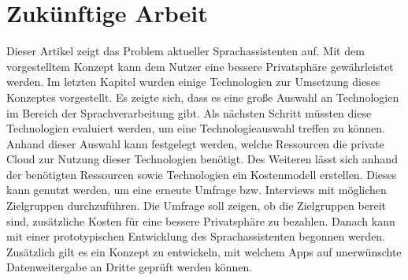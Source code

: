 \section{Zukünftige Arbeit}
Dieser Artikel zeigt das Problem aktueller Sprachassistenten auf. Mit dem vorgestelltem Konzept kann dem Nutzer eine bessere Privatsphäre gewährleistet werden. Im letzten Kapitel wurden einige Technologien zur Umsetzung dieses Konzeptes vorgestellt. Es zeigte sich, dass es eine große Auswahl an Technologien im Bereich der Sprachverarbeitung gibt. Als nächsten Schritt müssten diese Technologien evaluiert werden, um eine Technologieauswahl treffen zu können. Anhand dieser Auswahl kann festgelegt werden, welche Ressourcen die private Cloud zur Nutzung dieser Technologien benötigt. Des Weiteren lässt sich anhand der benötigten Ressourcen sowie Technologien ein Kostenmodell erstellen. Dieses kann genutzt werden, um eine erneute Umfrage bzw. Interviews mit möglichen Zielgruppen durchzuführen. Die Umfrage soll zeigen, ob die Zielgruppen bereit sind, zusätzliche Kosten für eine bessere Privatsphäre zu bezahlen. Danach kann mit einer prototypischen Entwicklung des Sprachassistenten begonnen werden. Zusätzlich gilt es ein Konzept zu entwickeln, mit welchem Apps auf unerwünschte Datenweitergabe an Dritte geprüft werden können. 